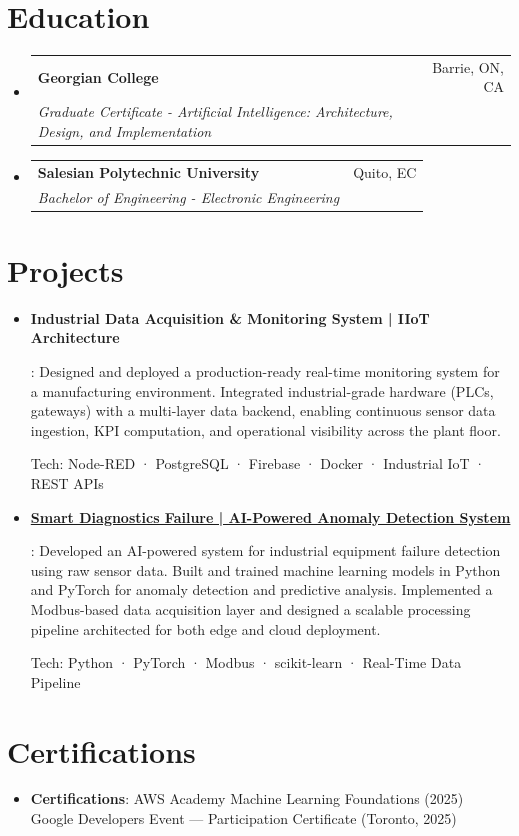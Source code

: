 \documentclass[letterpaper,11pt]{article}
\makeatletter
\newcommand{\resumeItem}[2]{
  \item\small{
    \textbf{#1}{: #2 \vspace{-2pt}}
  }
}
\newcommand{\resumeSubheading}[4]{
  \vspace{-1pt}\item
    \begin{tabular*}{0.97\textwidth}{l@{\extracolsep{\fill}}r}
      \textbf{#1} & #2 \\
      \textit{\small#3} & \textit{\small #4} \\
    \end{tabular*}\vspace{-5pt}
}
\newcommand{\resumeSubItem}[2]{\resumeItem{#1}{#2}\vspace{-4pt}}
\newcommand{\resumeSubHeadingListStart}{\begin{itemize}[leftmargin=*]}
\newcommand{\resumeSubHeadingListEnd}{\end{itemize}}
\makeatother
\begin{document}
\section{Education}
\resumeSubHeadingListStart
  \resumeSubheading
    {Georgian College}{Barrie, ON, CA}
    {Graduate Certificate - Artificial Intelligence: Architecture, Design, and Implementation}{}
  \resumeSubheading
    {Salesian Polytechnic University}{Quito, EC}
    {Bachelor of Engineering - Electronic Engineering}{}
\resumeSubHeadingListEnd

\section{Projects}
\resumeSubHeadingListStart
  \resumeSubItem{Industrial Data Acquisition \& Monitoring System | IIoT Architecture}
    {Designed and deployed a production-ready real-time monitoring system for a manufacturing environment. Integrated industrial-grade hardware (PLCs, gateways) with a multi-layer data backend, enabling continuous sensor data ingestion, KPI computation, and operational visibility across the plant floor.

    Tech: Node-RED · PostgreSQL · Firebase · Docker · Industrial IoT · REST APIs}

  \resumeSubItem{\href{https://github.com/DylanN25/SmartDiagnosticsFailure}{Smart Diagnostics Failure | AI-Powered Anomaly Detection System}}
    {Developed an AI-powered system for industrial equipment failure detection using raw sensor data. Built and trained machine learning models in Python and PyTorch for anomaly detection and predictive analysis. Implemented a Modbus-based data acquisition layer and designed a scalable processing pipeline architected for both edge and cloud deployment.

    Tech: Python · PyTorch · Modbus · scikit-learn · Real-Time Data Pipeline}
\resumeSubHeadingListEnd

\section{Certifications}
\resumeSubHeadingListStart
  \resumeSubItem{Certifications}
    {AWS Academy Machine Learning Foundations (2025) \\ Google Developers Event --- Participation Certificate (Toronto, 2025)}
\resumeSubHeadingListEnd
\end{document}
